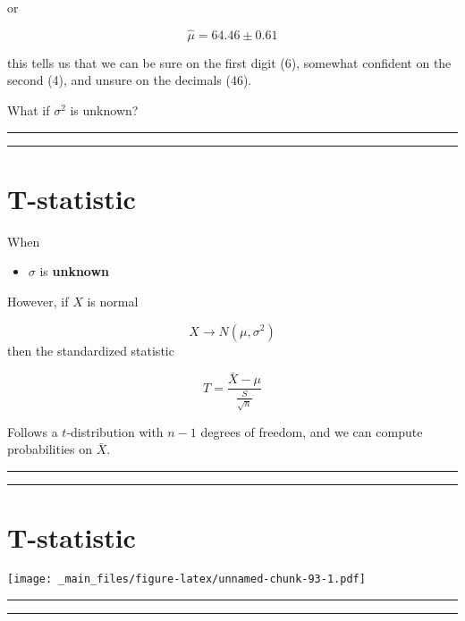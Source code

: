 \documentclass[
]{book}
\providecommand{\tightlist}{%
  \setlength{\itemsep}{0pt}\setlength{\parskip}{0pt}}
\begin{document}
or

\[\hat{\mu}=64.46 \pm 0.61\]

this tells us that we can be sure on the first digit (6), somewhat confident on the second (4), and unsure on the decimals (46).

What if \(\sigma^2\) is unknown?

\begin{center}\rule{0.5\linewidth}{0.5pt}\end{center}

\begin{center}\rule{0.5\linewidth}{0.5pt}\end{center}

\hypertarget{t-statistic-3}{%
\section{T-statistic}\label{t-statistic-3}}

When

\begin{itemize}
\tightlist
\item
  \(\sigma\) is \textbf{unknown}
\end{itemize}

However, if \(X\) is normal

\[X \rightarrow N(\mu, \sigma^2)\] then the standardized statistic

\[T=\frac{\bar{X}-\mu}{\frac{S}{\sqrt{n}}}\]

Follows a \(t\)-distribution with \(n-1\) degrees of freedom, and we can compute probabilities on \(\bar{X}\).

\begin{center}\rule{0.5\linewidth}{0.5pt}\end{center}

\begin{center}\rule{0.5\linewidth}{0.5pt}\end{center}

\hypertarget{t-statistic-4}{%
\section{T-statistic}\label{t-statistic-4}}

\texttt{[image: \_main\_files/figure-latex/unnamed-chunk-93-1.pdf]}

\begin{center}\rule{0.5\linewidth}{0.5pt}\end{center}

\begin{center}\rule{0.5\linewidth}{0.5pt}\end{center}
\end{document}

